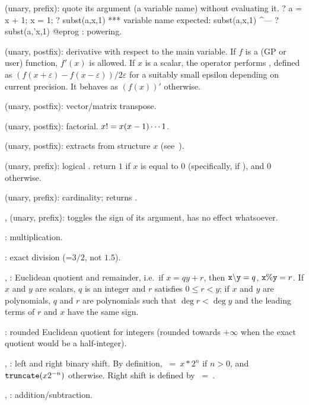 %
 (unary, prefix): quote its argument (a variable name) without
evaluating it.
\bprog
? a = x + 1; x = 1;
? subst(a,x,1)
  ***   variable name expected: subst(a,x,1)
                                        ^---
? subst(a,'x,1)
@eprog
%
\kbd{\pow}: powering.

 (unary, postfix): derivative with respect to the main variable. If
$f$ is a (GP or user) function, $f'(x)$ is allowed. If $x$ is a scalar, the
operator performs , defined as $(f(x+\varepsilon) -
f(x-\varepsilon)) / 2\varepsilon$ for a suitably small epsilon depending on
current precision. It behaves as $(f(x))'$ otherwise.

\strut\kbd{\til} (unary, postfix): vector/matrix transpose.

\kbd{!} (unary, postfix): factorial. $x{\tt !}=x(x-1)\cdots 1$.

 (unary, postfix):  extracts
 from structure $x$ (see~).

%
\kbd{!} (unary, prefix): logical .  return $1$ if $x$ is
equal to $0$ (specifically, if ), and $0$ otherwise.

\kbd{\#} (unary, prefix): cardinality;  returns .

%
\kbd{+}, \kbd{-} (unary, prefix): \kbd{-} toggles the sign of its argument,
\kbd{+} has no effect whatsoever.

%
\kbd{*}: multiplication.

\kbd{/}: exact division (=$3/2$, not $1.5$).

\kbd{\bs}, \kbd{\%}: Euclidean quotient and remainder, i.e.~if $x =
qy + r$, then $\kbd{x \b{ } y} = q$, ${\tt x\%y} = r$. If $x$ and $y$
are scalars, $q$ is an integer and $r$ satisfies $0\le r < y$; if $x$ and $y$
are polynomials, $q$ and $r$ are polynomials such that $\deg r< \deg y$ and
the leading terms of $r$ and $x$ have the same sign.

\kbd{\bs/}: rounded Euclidean quotient for integers (rounded towards
$+\infty$ when the exact quotient would be a half-integer).

\kbd{<<}, \kbd{>>}: left and right binary shift. By definition,
$~=~x * 2^n$ if $n>0$, and ${\tt truncate}(x 2^{-n})$ otherwise.
Right shift is defined by $~=~$.

%
\kbd{+}, \kbd{-}: addition/subtraction.

